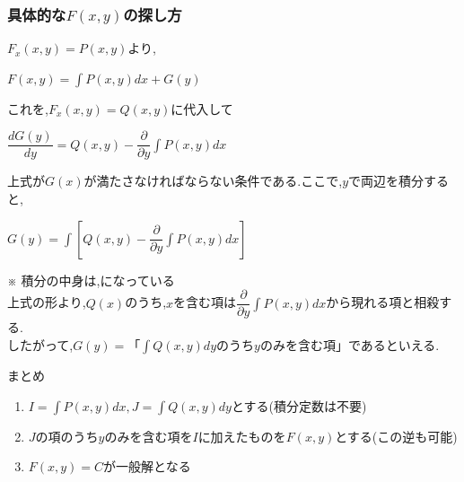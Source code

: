 \documentclass[a4paper]{jsarticle}
\begin{document}
\subsubsection{具体的な$F\left(x,y\right)$の探し方}
$F_x\left(x,y\right)=P\left(x,y\right)$より,
\begin{center}
    $F\left(x,y\right)=\displaystyle\int P\left(x,y\right)dx+G\left(y\right)$
\end{center}
これを,$F_x\left(x,y\right)=Q\left(x,y\right)$に代入して
\begin{center}
    $\displaystyle\dfrac{dG\left(y\right)}{dy}=Q\left(x,y\right)-\dfrac{\partial}{\partial y}\int P\left(x,y\right)dx$
\end{center}
上式が$G\left(x\right)$が満たさなければならない条件である.ここで,$y$で両辺を積分すると,
\begin{center}
    $\displaystyle G\left(y\right)=\int \left[Q\left(x,y\right)-\dfrac{\partial}{\partial y}\int P\left(x,y\right)dx\right]$
\end{center}
※ 積分の中身は,になっている\\
上式の形より,$Q\left(x\right)$のうち,$x$を含む項は$\dfrac{\partial}{\partial y}\int P\left(x,y\right)dx$から現れる項と相殺する.\\
したがって,$G\left(y\right)=$「$\int Q\left(x,y\right)dy$のうち$y$のみを含む項」であるといえる.
\begin{itembox}[l]{まとめ}
    \begin{enumerate}[(1)]
        \item $I=\int P\left(x,y\right)dx,J=\int Q\left(x,y\right)dy$とする(積分定数は不要)
        \item $J$の項のうち$y$のみを含む項を$I$に加えたものを$F\left(x,y\right)$とする(この逆も可能)
        \item $F\left(x,y\right)=C$が一般解となる
    \end{enumerate}
\end{itembox}
\end{document}
